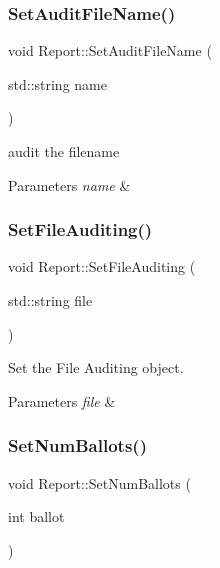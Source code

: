\subsubsection{\texorpdfstring{Set\+Audit\+File\+Name()}{SetAuditFileName()}}
{\footnotesize\ttfamily void Report\+::\+Set\+Audit\+File\+Name (\begin{DoxyParamCaption}\item[{std\+::string}]{name }\end{DoxyParamCaption})\hspace{0.3cm}{\ttfamily [inline]}}



audit the filename 


\begin{DoxyParams}{Parameters}
{\em name} & \\
\hline
\end{DoxyParams}
\mbox{\label{classReport_a23043c84ac408fe6ec2bc03d1dc0b700}} 
\subsubsection{\texorpdfstring{Set\+File\+Auditing()}{SetFileAuditing()}}
{\footnotesize\ttfamily void Report\+::\+Set\+File\+Auditing (\begin{DoxyParamCaption}\item[{std\+::string}]{file }\end{DoxyParamCaption})\hspace{0.3cm}{\ttfamily [inline]}}



Set the File Auditing object. 


\begin{DoxyParams}{Parameters}
{\em file} & \\
\hline
\end{DoxyParams}
\mbox{\label{classReport_a0277f54bdd8aea6634b9e775382d2eb3}} 
\subsubsection{\texorpdfstring{Set\+Num\+Ballots()}{SetNumBallots()}}
{\footnotesize\ttfamily void Report\+::\+Set\+Num\+Ballots (\begin{DoxyParamCaption}\item[{int}]{ballot }\end{DoxyParamCaption})\hspace{0.3cm}{\ttfamily [inline]}}



